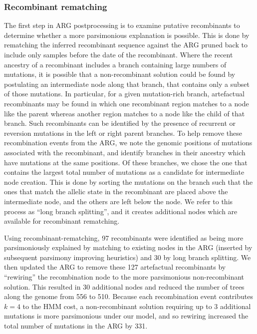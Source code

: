 \documentclass[12pt]{article}
\begin{document}
\subsubsection*{Recombinant rematching}
The first step in ARG postprocessing is to examine putative recombinants to
determine whether a more parsimonious explanation is possible. This is done
by rematching the inferred recombinant sequence against the ARG pruned back
to include only samples before the date of the recombinant.
Where the recent ancestry of a recombinant includes a branch containing
large numbers of mutations, it is possible
that a non-recombinant solution could be found by postulating an intermediate
node along that branch, that contains only a subset of those mutations.
In particular, for a given mutation-rich branch, artefactual recombinants may
be found in which one recombinant region matches to
a node like the parent whereas another region matches to a node like the child
of that branch. Such recombinants can be identified by the
presence of recurrent or reversion mutations in the left or right parent branches.
To help remove these recombination events from the ARG, we note the genomic positions
of mutations associated with the recombinant, and identify branches
in their ancestry which have mutations at the same positions. Of these branches,
we chose the one that contains the largest total number of mutations as
a candidate for intermediate node creation. This is done by sorting the
mutations on the branch such that the ones that match the allelic state in the
recombinant are placed above the intermediate node, and the others are left
below the node. We refer to this process as ``long branch splitting'', and it
creates additional nodes which are available for recombinant rematching.

Using recombinant-rematching,
97 recombinants were identified as being more parsimoniously
explained by matching to existing nodes in the ARG (inserted by
subsequent parsimony improving heuristics) and 30 by long branch
splitting.
We then updated the ARG to remove these 127 artefactual
recombinants by ``rewiring'' the recombination node to the
more parsimonious non-recombinant solution. This
resulted in 30 additional nodes and reduced
the number of trees along the genome from 556 to 510.
Because each recombination event contributes $k=4$ to the HMM cost,
a non-recombinant solution requiring up to 3 additional mutations
is more parsimonious under our model, and so rewiring
increased the total number of mutations in the ARG by 331.
\end{document}
